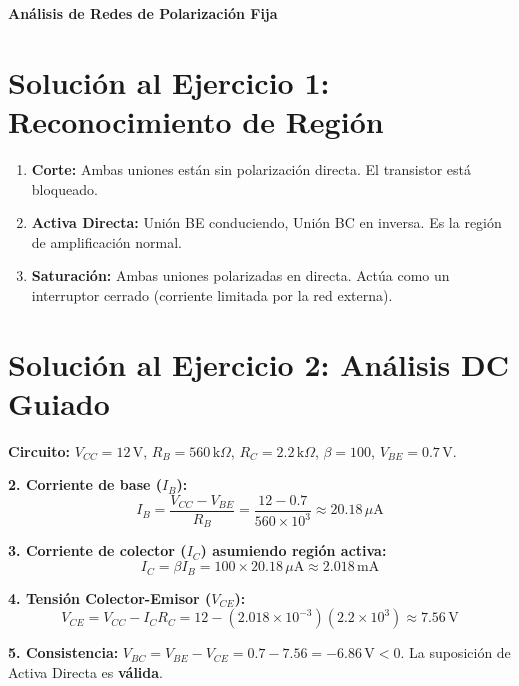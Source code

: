 \documentclass[11pt, a4paper]{article}
\begin{document}
\begin{tcolorbox}[colback=green!5!white, colframe=green!50!black, title=\textbf{Solucionario: Polarización DC del BJT}]
    \centering \large \textbf{Análisis de Redes de Polarización Fija}
\end{tcolorbox}

\section*{Solución al Ejercicio 1: Reconocimiento de Región}
\begin{enumerate}
    \item \textbf{Corte:} Ambas uniones están sin polarización directa. El transistor está bloqueado.
    \item \textbf{Activa Directa:} Unión BE conduciendo, Unión BC en inversa. Es la región de amplificación normal.
    \item \textbf{Saturación:} Ambas uniones polarizadas en directa. Actúa como un interruptor cerrado (corriente limitada por la red externa).
\end{enumerate}

\section*{Solución al Ejercicio 2: Análisis DC Guiado}
\textbf{Circuito:} $V_{CC}=12\,\text{V}$, $R_B=560\,\text{k}\Omega$, $R_C=2.2\,\text{k}\Omega$, $\beta=100$, $V_{BE}=0.7\,\text{V}$.

\textbf{2. Corriente de base ($I_B$):}
\begin{equation*}
    I_B = \frac{V_{CC} - V_{BE}}{R_B} = \frac{12 - 0.7}{560 \times 10^3} \approx 20.18\,\mu\text{A}
\end{equation*}

\textbf{3. Corriente de colector ($I_C$) asumiendo región activa:}
\begin{equation*}
    I_C = \beta I_B = 100 \times 20.18\,\mu\text{A} \approx 2.018\,\text{mA}
\end{equation*}

\textbf{4. Tensión Colector-Emisor ($V_{CE}$):}
\begin{equation*}
    V_{CE} = V_{CC} - I_C R_C = 12 - (2.018 \times 10^{-3})(2.2 \times 10^3) \approx 7.56\,\text{V}
\end{equation*}

\textbf{5. Consistencia:}
$V_{BC} = V_{BE} - V_{CE} = 0.7 - 7.56 = -6.86\,\text{V} < 0$. La suposición de Activa Directa es \textbf{válida}.
\end{document}
